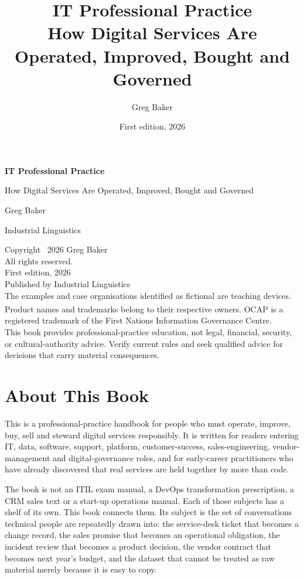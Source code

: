 \documentclass[11pt,openany]{book}
\title{IT Professional Practice\\\large How Digital Services Are Operated, Improved, Bought and Governed}
\author{Greg Baker}
\date{First edition, 2026}
\begin{document}
\begin{titlepage}
\thispagestyle{empty}
\vspace*{0.12\textheight}
{\Huge\bfseries IT Professional Practice\par}
\vspace{1.2em}
\begin{minipage}{0.86\textwidth}
\raggedright\Large How Digital Services Are Operated, Improved, Bought and Governed
\end{minipage}
\vfill
{\large Greg Baker\par}
{\large Industrial Linguistics\par}
\end{titlepage}

\thispagestyle{empty}
\vspace*{\fill}
\noindent Copyright \textcopyright\ 2026 Greg Baker\\
All rights reserved.\\[1.2em]
\noindent First edition, 2026\\
Published by Industrial Linguistics\\

\noindent The examples and case organisations identified as fictional are
teaching devices. Product names and trademarks belong to their respective
owners. OCAP\textsuperscript{\textregistered} is a registered trademark of
the First Nations Information Governance Centre.\\[1.2em]
\noindent This book provides professional-practice education, not legal,
financial, security, or cultural-authority advice. Verify current rules and
seek qualified advice for decisions that carry material consequences.
\clearpage

\frontmatter
\chapter*{About This Book}
\setcounter{secnumdepth}{-1}
This is a professional-practice handbook for people who must operate, improve, buy, sell and steward digital services responsibly. It is written for readers entering IT, data, software, support, platform, customer-success, sales-engineering, vendor-management and digital-governance roles, and for early-career practitioners who have already discovered that real services are held together by more than code.


The book is not an ITIL exam manual, a DevOps transformation prescription, a CRM sales text or a start-up operations manual. Each of those subjects has a shelf of its own. This book connects them. Its subject is the set of conversations technical people are repeatedly drawn into: the service-desk ticket that becomes a change record, the sales promise that becomes an operational obligation, the incident review that becomes a product decision, the vendor contract that becomes next year's budget, and the dataset that cannot be treated as raw material merely because it is easy to copy.
\end{document}
